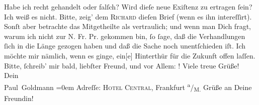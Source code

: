 \begin{ledgroupsized}[t]{13cm}
           \pstart
           Habe ich recht gehandelt oder falſch? Wird  dieſe neue Exiſtenz zu
               ertragen ſein? Ich weiß es nicht.\pend
           \pstart
           Bitte, zeig’ dem \textsc{Richard} dieſen Brief (wenn es ihn intereſſirt). Sonſt aber betrachte das Mitgetheilte
               als vertraulich; und wenn man  Dich fragt, warum ich
               nicht zur N. Fr. Pr. gekommen bin, ſo  ſage, daß die Verhandlungen
               ſich in die Länge gezogen haben und daß die Sache noch unentſchieden iſt. Ich möchte
               mir nämlich, wenn es ginge, ein{[}e{]} Hinterthür für die Zukunft
               offen laſſen.\pend
           \pstart
           Bitte, ſchreib’ mir bald, liebſter Freund, und vor Allem: \label{K_L02868-45v}\label{K_L02868-45h}!\pend
           \pstart
           Viele treue Grüße! {\\[\baselineskip]}Dein {\\[\baselineskip]}\spacefill\mbox{Paul Goldmann}\pend
           \leftskip=0em{}\pstart
           \noindent{}Adreſſe: \textsc{Hotel Central}, Frankfurt \textsuperscript{a}/\textsubscript{M.}\pend
           \pstart
           Grüße an Deine Freundin!\pend
           
         
         \endnumbering{}\end{ledgroupsized}  \newcommand{\dateiname}{L02868}\newcommand{\titel}{Paul Goldmann an Arthur Schnitzler, 5. 3. [1899]}\newcommand{\editorInnen}{Martin Anton Müller und Laura Untner}
      